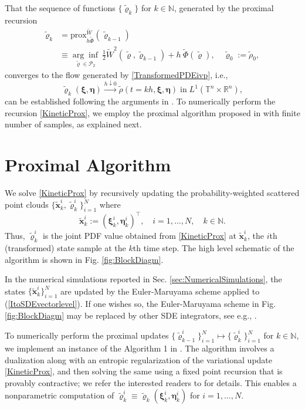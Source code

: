 \documentclass[10pt,twocolumn]{IEEEtran}
\begin{document}
That the sequence of functions $\{\tilde{\varrho}_{k}\}$ for $k\in\mathbb{N}$, generated by the proximal recursion
\begin{align}
\tilde{\varrho}_{k} &= {\text{prox}}^{\widetilde{W}}_{h\widetilde{\Phi}}(\tilde{\varrho}_{k-1}) \nonumber\\
&\equiv \underset{\tilde{\varrho}\in\mathcal{P}_{2}}{\arg\inf}\:\frac{1}{2}\widetilde{W}^{2}\left(\tilde{\varrho},\tilde{\varrho}_{k-1}\right) + h\:\widetilde{\Phi}(\tilde{\varrho}), \quad \tilde{\varrho}_{0} := \tilde{\rho}_{0},
\label{KineticProx}	
\end{align}
converges to the flow generated by \eqref{TransformedPDEivp}, i.e., 
$$\tilde{\varrho}_{k}(\bm{\xi},\bm{\eta}) \xrightarrow{h\downarrow 0} \tilde{\rho}(t=kh,\bm{\xi},\bm{\eta})\;\text{in}\;L^{1}\left(\mathbb{T}^{n}\times\mathbb{R}^{n}\right),$$
can be established following the arguments in \cite{duong2014conservative}. To numerically perform the recursion \eqref{KineticProx}, we employ the proximal algorithm proposed in \cite{caluya2019TAC} with finite number of samples, as explained next.







\section{Proximal Algorithm}\label{sec:ProxAlgo}
We solve \eqref{KineticProx} by recursively updating the probability-weighted scattered point clouds $\{\tilde{\bm{x}}_{k}^{i},\tilde{\varrho}_{k}^{i}\}_{i=1}^{N}$ where 
$$\tilde{\bm{x}}_{k}^{i}:=\left(\bm{\xi}_{k}^{i},\bm{\eta}_{k}^{i}\right)^{\!\top}, \quad i=1,\hdots,N, \quad k\in\mathbb{N}.$$
Thus, $\tilde{\varrho}_{k}^{i}$ is the joint PDF value obtained from \eqref{KineticProx} at $\tilde{\bm{x}}_{k}^{i}$, the $i$th (transformed) state sample at the $k$th time step. The high level schematic of the algorithm is shown in Fig. \ref{fig:BlockDiagm}. 


In the numerical simulations reported in Sec. \ref{sec:NumericalSimulations}, the states $\{\tilde{\bm{x}}_{k}^{i}\}_{i=1}^{N}$ are updated by the Euler-Maruyama scheme applied to (\ref{ItoSDEvectorlevel}). If one wishes so, the Euler-Maruyama scheme in Fig. \ref{fig:BlockDiagm} may be replaced by other SDE integrators, see e.g., \cite[Sec. III.B.2, Remark 1]{caluya2019TAC}. 

To numerically perform the proximal updates $\{\tilde{\varrho}_{k-1}^{i}\}_{i=1}^{N}\mapsto\{\tilde{\varrho}_{k}^{i}\}_{i=1}^{N}$ for $k\in\mathbb{N}$, we implement an instance of the Algorithm 1 in \cite{caluya2019TAC}. The algorithm involves a dualization along
with an entropic regularization of the variational update \eqref{KineticProx}, and then solving the same using a fixed point recursion that is provably contractive; we refer the interested readers to \cite[Sec. V.B]{caluya2019TAC} for details. This enables a nonparametric computation of $\tilde{\varrho}_{k}^{i} \equiv \tilde{\varrho}_{k}\left(\bm{\xi}_{k}^{i},\bm{\eta}_{k}^{i}\right)$ for $i=1,\hdots,N$.
\end{document}
